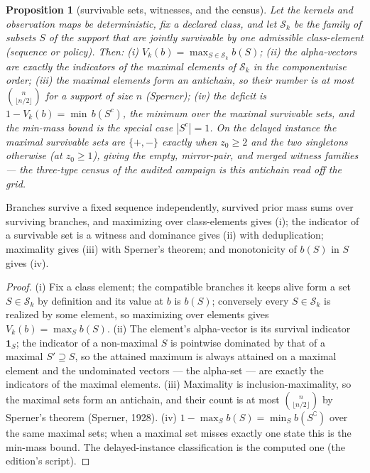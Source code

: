 \documentclass[10pt,twocolumn]{article}
\theoremstyle{plain}
\newtheorem{proposition}[theorem]{Proposition}
\theoremstyle{definition}
\theoremstyle{remark}
\begin{document}
\begin{proposition}[survivable sets, witnesses, and the census]\label{prop:antichain}
Let the kernels and observation maps be deterministic, fix a declared
class, and let \(\mathcal{S}_{k}\) be the family of subsets
\(S\) of the support that are jointly survivable by one admissible
class-element (sequence or policy). Then:
(i) \(V_{k}(b) = \max_{S \in \mathcal{S}_{k}} b(S)\);
(ii) the alpha-vectors are exactly the indicators of the maximal elements
of \(\mathcal{S}_{k}\) in the componentwise order;
(iii) the maximal elements form an antichain, so their number is at
most \(\binom{n}{\lfloor n/2 \rfloor}\) for a support of size
\(n\) (Sperner);
(iv) the deficit is \(1 - V_{k}(b) = \min \, b(S^{c})\), the minimum
over the maximal survivable sets, and the min-mass bound is the special
case \(|S^{c}| = 1\).
On the delayed instance the maximal survivable sets are
\(\{+, -\}\) exactly when \(z_{0} \ge 2\) and the two singletons
otherwise (at \(z_{0} \ge 1\)), giving the empty, mirror-pair, and
merged witness families --- the three-type census of the audited campaign
is this antichain read off the grid.
\end{proposition}

Branches survive a fixed sequence independently, survived prior mass sums
over surviving branches, and maximizing over class-elements gives (i);
the indicator of a survivable set is a witness and dominance gives (ii)
with deduplication; maximality gives (iii) with Sperner's theorem; and
monotonicity of \(b(S)\) in \(S\) gives (iv).

\begin{proof}
(i) Fix a class element; the compatible branches it keeps alive form a
set \(S \in \mathcal{S}_{k}\) by definition and its value at \(b\) is
\(b(S)\); conversely every \(S \in \mathcal{S}_{k}\) is realized by
some element, so maximizing over elements gives
\(V_{k}(b) = \max_{S} b(S)\). (ii) The element's alpha-vector is its
survival indicator \(\mathbf{1}_{S}\); the indicator of a non-maximal
\(S\) is pointwise dominated by that of a maximal \(S' \supseteq S\),
so the attained maximum is always attained on a maximal element and the
undominated vectors --- the alpha-set --- are exactly the indicators of
the maximal elements. (iii) Maximality is inclusion-maximality, so the
maximal sets form an antichain, and their count is at most
\(\binom{n}{\lfloor n/2 \rfloor}\) by Sperner's theorem (Sperner,
1928). (iv) \(1 - \max_{S} b(S) = \min_{S} b(S^{\complement})\) over
the same maximal sets; when a maximal set misses exactly one state this
is the min-mass bound. The delayed-instance classification is the
computed one (the edition's script).
\end{proof}
\end{document}
